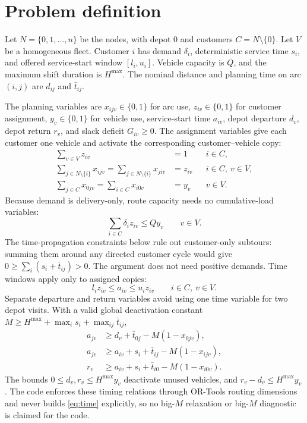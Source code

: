 \documentclass[11pt,a4paper]{article}
\begin{document}
\section{Problem definition}

Let $N=\{0,1,\ldots,n\}$ be the nodes, with depot 0 and customers
$C=N\setminus\{0\}$. Let $V$ be a homogeneous fleet. Customer $i$ has demand
$\delta_i$, deterministic service time $s_i$, and offered service-start window
$[l_i,u_i]$. Vehicle capacity is $Q$, and the maximum shift duration is
$H^{\max}$. The nominal distance and planning time on arc $(i,j)$ are $d_{ij}$
and $\bar t_{ij}$.

The planning variables are $x_{ijv}\in\{0,1\}$ for arc use,
$z_{iv}\in\{0,1\}$ for customer assignment, $y_v\in\{0,1\}$ for vehicle use,
service-start time $a_{iv}$, depot departure $d_v$, depot return $r_v$, and
slack deficit $G_{iv}\geq0$. The assignment variables give each customer one
vehicle and activate the corresponding customer--vehicle copy:
\begin{align}
 \sum_{v\in V} z_{iv} &= 1 && i\in C, \\
 \sum_{j\in N\setminus\{i\}}x_{ijv}
   =\sum_{j\in N\setminus\{i\}}x_{jiv} &= z_{iv}
      && i\in C,\ v\in V, \\
 \sum_{j\in C}x_{0jv}=\sum_{i\in C}x_{i0v} &= y_v
      && v\in V.                                            \label{eq:flow}
\end{align}
Because demand is delivery-only, route capacity needs no cumulative-load
variables:
\begin{equation}
 \sum_{i\in C}\delta_i z_{iv}\leq Qy_v \qquad v\in V.       \label{eq:capacity}
\end{equation}
The time-propagation constraints below rule out customer-only subtours: summing
them around any directed customer cycle would give
$0\geq\sum_i(s_i+\bar t_{ij})>0$. The argument does not need positive demands.
Time windows apply only to assigned copies:
\begin{equation}
 l_i z_{iv}\leq a_{iv}\leq u_i z_{iv}
 \qquad i\in C,\ v\in V.                                   \label{eq:activate}
\end{equation}
Separate departure and return variables avoid using one time variable for two
depot visits. With a valid global deactivation constant
$M\geq H^{\max}+\max_i s_i+\max_{ij}\bar t_{ij}$,
\begin{align}
 a_{jv} &\geq d_v+\bar t_{0j}-M(1-x_{0jv}), \\
 a_{jv} &\geq a_{iv}+s_i+\bar t_{ij}-M(1-x_{ijv}), \\
 r_v &\geq a_{iv}+s_i+\bar t_{i0}-M(1-x_{i0v}).              \label{eq:time}
\end{align}
The bounds $0\leq d_v,r_v\leq H^{\max}y_v$ deactivate unused vehicles, and
$r_v-d_v\leq H^{\max}y_v$. The code enforces these timing relations through
OR-Tools routing dimensions and never builds \eqref{eq:time} explicitly, so no
big-$M$ relaxation or big-$M$ diagnostic is claimed for the code.
\end{document}
